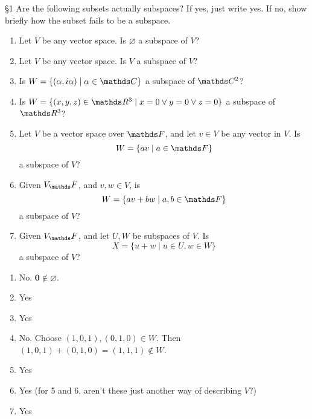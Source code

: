 \documentclass{review-sheet}
\begin{document}
\begin{problem}{\S 1}
  Are the following subsets actually subspaces? If yes, just write yes. If no, show briefly how the
  subset fails to be a subspace.
  \begin{enumerate}
    \item Let $V$ be any vector space. Is $\varnothing$ a subspace of $V$?
    \item Let $V$ be any vector space. Is $V$ a subspace of $V$?
    \item Is $W=\{\left( \alpha,i\alpha \right) \mid \alpha\in \C\} $ a subspace of $\C^2$?
    \item Is $W=\{(x,y,z)\in \R^3\mid x=0\lor y=0\lor z=0\} $ a subspace of $\R^3$?
    \item Let $V$ be a vector space over $\F$, and  let $v\in V$ be any vector in $V$. Is \[
        W=\{av\mid a\in \F\} 
      \] a subspace of $V$?
    \item Given $V_\F$, and $v,w\in V$, is \[
        W=\{av+bw\mid a,b\in \F\} 
      \] a subspace of $V$?
    \item Given $V_\F$, and let $U,W$ be subspaces of $V$. Is \[
        X = \{u+w\mid u\in U, w\in W\} 
      \]  a subspace of $V$?
  \end{enumerate}
\end{problem}

\begin{solution}
  \begin{enumerate}
    \item No. $\textbf{0}\not\in \varnothing$.
    \item Yes
    \item Yes
    \item No. Choose $(1,0,1),(0,1,0)\in W$. Then $(1,0,1)+(0,1,0)=(1,1,1)\not\in W$.
    \item Yes
    \item Yes (for 5 and 6, aren't these just another way of describing $V$?)
    \item Yes
  \end{enumerate}
\end{solution}
\end{document}
